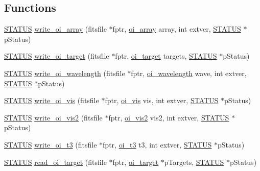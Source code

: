 \subsection*{Functions}
\begin{DoxyCompactItemize}
\item 
\hyperlink{group__oitable_ga0cb9c7fae5afe4237eb4d5d43318fa18}{STATUS} \hyperlink{group__oitable_ga971d883c751f790058b7beaf901bb40f}{write\_\-oi\_\-array} (fitsfile $\ast$fptr, \hyperlink{structoi__array}{oi\_\-array} array, int extver, \hyperlink{group__oitable_ga0cb9c7fae5afe4237eb4d5d43318fa18}{STATUS} $\ast$pStatus)
\item 
\hyperlink{group__oitable_ga0cb9c7fae5afe4237eb4d5d43318fa18}{STATUS} \hyperlink{group__oitable_ga57a8c8d6c20938a330d4830ac014d19e}{write\_\-oi\_\-target} (fitsfile $\ast$fptr, \hyperlink{structoi__target}{oi\_\-target} targets, \hyperlink{group__oitable_ga0cb9c7fae5afe4237eb4d5d43318fa18}{STATUS} $\ast$pStatus)
\item 
\hyperlink{group__oitable_ga0cb9c7fae5afe4237eb4d5d43318fa18}{STATUS} \hyperlink{group__oitable_ga1e71eee95f16623bb031916e4ec7da23}{write\_\-oi\_\-wavelength} (fitsfile $\ast$fptr, \hyperlink{structoi__wavelength}{oi\_\-wavelength} wave, int extver, \hyperlink{group__oitable_ga0cb9c7fae5afe4237eb4d5d43318fa18}{STATUS} $\ast$pStatus)
\item 
\hyperlink{group__oitable_ga0cb9c7fae5afe4237eb4d5d43318fa18}{STATUS} \hyperlink{group__oitable_ga06589bd77fa01b43a8e36acf2103de76}{write\_\-oi\_\-vis} (fitsfile $\ast$fptr, \hyperlink{structoi__vis}{oi\_\-vis} vis, int extver, \hyperlink{group__oitable_ga0cb9c7fae5afe4237eb4d5d43318fa18}{STATUS} $\ast$pStatus)
\item 
\hyperlink{group__oitable_ga0cb9c7fae5afe4237eb4d5d43318fa18}{STATUS} \hyperlink{group__oitable_ga5f69a00849108909a3cdd4923cc02028}{write\_\-oi\_\-vis2} (fitsfile $\ast$fptr, \hyperlink{structoi__vis2}{oi\_\-vis2} vis2, int extver, \hyperlink{group__oitable_ga0cb9c7fae5afe4237eb4d5d43318fa18}{STATUS} $\ast$pStatus)
\item 
\hyperlink{group__oitable_ga0cb9c7fae5afe4237eb4d5d43318fa18}{STATUS} \hyperlink{group__oitable_gadd1d53e7ff4d0b5b64ffbd2b364ca31a}{write\_\-oi\_\-t3} (fitsfile $\ast$fptr, \hyperlink{structoi__t3}{oi\_\-t3} t3, int extver, \hyperlink{group__oitable_ga0cb9c7fae5afe4237eb4d5d43318fa18}{STATUS} $\ast$pStatus)
\item 
\hyperlink{group__oitable_ga0cb9c7fae5afe4237eb4d5d43318fa18}{STATUS} \hyperlink{group__oitable_ga661f4bdb8557b4a72f4f022db686fd19}{read\_\-oi\_\-target} (fitsfile $\ast$fptr, \hyperlink{structoi__target}{oi\_\-target} $\ast$pTargets, \hyperlink{group__oitable_ga0cb9c7fae5afe4237eb4d5d43318fa18}{STATUS} $\ast$pStatus)

\end{DoxyCompactItemize}

